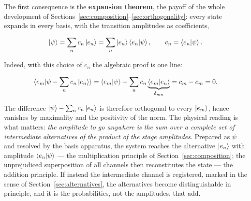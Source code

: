 The first consequence is the \textbf{expansion theorem}, the payoff of the whole development of Sections~\ref{sec:composition}--\ref{sec:orthogonality}: every state expands in every basis, with the transition amplitudes as coefficients,
\begin{linenomath}
    \begin{equation}
        \ket{\psi}=\sum_n c_n\ket{e_n}=\sum_n\ket{e_n}\braket{e_n|\psi},
        \qquad
        c_n=\braket{e_n|\psi}.
        \label{eq:expansion}
    \end{equation}
\end{linenomath}
Indeed, with this choice of $c_n$ the algebraic proof is one line:
\begin{linenomath}
\begin{equation*}
    \braket{e_m|\psi-\sum_n c_n\ket{e_n}}
    = \braket{e_m|\psi} - \sum_n c_n\underbrace{\braket{e_m|e_n}}_{\delta_{mn}}
    = c_m - c_m = 0 .
\end{equation*}
\end{linenomath}
The difference $\ket{\psi}-\sum_n c_n\ket{e_n}$ is therefore orthogonal to every $\ket{e_m}$, hence vanishes by maximality and the positivity of the norm. The physical reading is what matters: \emph{the amplitude to go anywhere is the sum over a complete set of intermediate alternatives of the product of the stage amplitudes}. Prepared as $\psi$ and resolved by the basis apparatus, the system reaches the alternative $\ket{e_n}$ with amplitude $\braket{e_n|\psi}$ --- the multiplication principle of Section~\ref{sec:composition}; the unprejudiced superposition of all channels then reconstitutes the state --- the addition principle. If instead the intermediate channel is registered, marked in the sense of Section~\ref{sec:alternatives}, the alternatives become distinguishable in principle, and it is the probabilities, not the amplitudes, that add.

